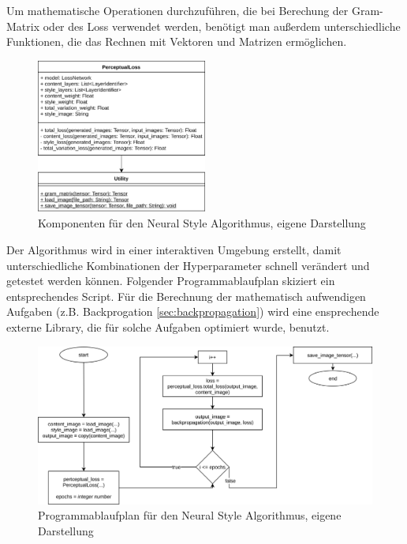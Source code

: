 Um mathematische Operationen durchzuführen, die bei Berechung der Gram-Matrix oder des Loss verwendet werden, benötigt man außerdem unterschiedliche Funktionen, die das Rechnen mit Vektoren und Matrizen ermöglichen.


\begin{figure}[H]
	\centering
	\includegraphics[width=0.50\textwidth]{resources/content/neural_style_class_diagram.png}
	\caption{Komponenten für den Neural Style Algorithmus, eigene Darstellung}
	\label{img:neural_style_class_diagram_img}
\end{figure}

Der Algorithmus wird in einer interaktiven Umgebung erstellt, damit unterschiedliche Kombinationen der Hyperparameter schnell verändert und getestet werden können. Folgender Programmablaufplan skiziert ein entsprechendes Script. Für die Berechnung der mathematisch aufwendigen Aufgaben (z.B. Backprogation \ref{sec:backpropagation}) wird eine ensprechende externe Library, die für solche Aufgaben optimiert wurde, benutzt.

\begin{figure}[H]
	\centering
	\includegraphics[width=1.0\textwidth]{resources/content/neural_style_pap.png}
	\caption{Programmablaufplan für den Neural Style Algorithmus, eigene Darstellung}
	\label{img:neural_style_pap_img}
\end{figure}

